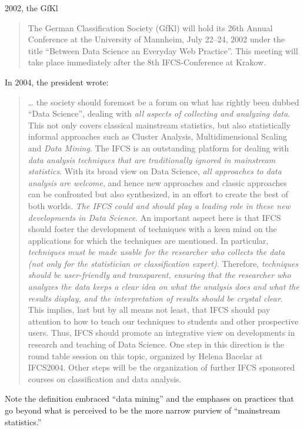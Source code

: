 \documentclass[
  letterpaper,
]{report}
\begin{document}
2002, the GfKl

\begin{quote}
The German Classification Society (GfKl) will hold its 26th Annual
Conference at the University of Mannheim, July 22--24, 2002 under the
title ``Between Data Science an Everyday Web Practice''. This meeting
will take place immediately after the 8th IFCS-Conference at Krakow.
\end{quote}

In 2004, the president wrote:

\begin{quote}
\ldots{} the society should foremost be a forum on what has rightly been
dubbed ``Data Science'', dealing with \emph{all aspects of collecting
and analyzing data}. This not only covers classical mainstream
statistics, but also statistically informal approaches such as Cluster
Analysis, Multidimensional Scaling and \emph{Data Mining}. The IFCS is
an outstanding platform for dealing with \emph{data analysis techniques
that are traditionally ignored in mainstream statistics}. With its broad
view on Data Science, \emph{all approaches to data analysis are
welcome}, and hence new approaches and classic approaches can be
confronted but also synthesized, in an effort to create the best of both
worlds. \emph{The IFCS could and should play a leading role in these new
developments in Data Science}. An important aspect here is that IFCS
should foster the development of techniques with a keen mind on the
applications for which the techniques are mentioned. In particular,
\emph{techniques must be made usable for the researcher who collects the
data (not only for the statistician or classification expert)}.
Therefore, \emph{techniques should be user-friendly and transparent,
ensuring that the researcher who analyzes the data keeps a clear idea on
what the analysis does and what the results display, and the
interpretation of results should be crystal clear}. This implies, last
but by all means not least, that IFCS should pay attention to how to
teach our techniques to students and other prospective users. Thus, IFCS
should promote an integrative view on developments in research and
teaching of Data Science. One step in this direction is the round table
session on this topic, organized by Helena Bacelar at IFCS2004. Other
steps will be the organization of further IFCS sponsored courses on
classification and data analysis.
\end{quote}

Note the definition embraced ``data mining'' and the emphases on
practices that go beyond what is perceived to be the more narrow purview
of ``mainstream statistics.''
\end{document}
